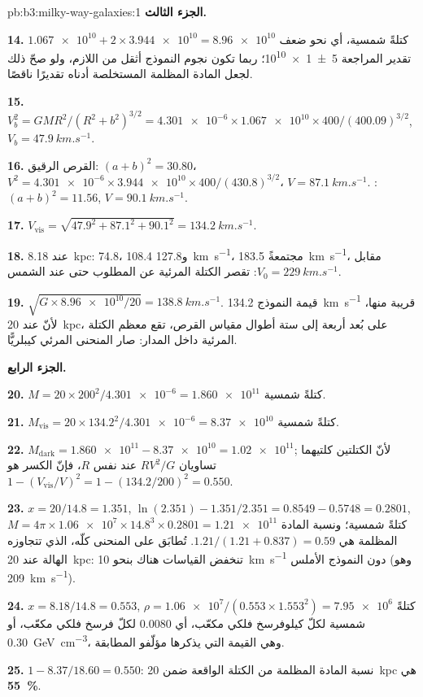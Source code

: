 \begin{solution}{pb:b3:milky-way-galaxies:1}
\textbf{الجزء الثالث.}

\textbf{14.} $\num{1.067e10} + 2\times\num{3.944e10} = \num{8.96e10}$ كتلةً
شمسية، أي نحو ضعف تقدير المراجعة \num[separate-uncertainty=true]{5 \pm 1 e10}؛ ربما تكون نجوم النموذج أثقل من اللازم،
ولو صحّ ذلك لجعل المادة المظلمة المستخلصة أدناه
تقديرًا ناقصًا.

\textbf{15.} $V_b^2 = GMR^2/(R^2 + b^2)^{3/2} = \num{4.301e-6}\times\num{1.067e10}
\times400/(400.09)^{3/2}$, $V_b = \qty{47.9}{km.s^{-1}}$.

\textbf{16.} القرص الرقيق: $(a + b)^2 = 30.80$، $V^2 = \num{4.301e-6}\times\num{3.944e10}
\times400/(430.8)^{3/2}$، $V = \qty{87.1}{km.s^{-1}}$. :
$(a + b)^2 = 11.56$, $V = \qty{90.1}{km.s^{-1}}$.

\textbf{17.} $V_\mathrm{vis} = \sqrt{47.9^2 + 87.1^2 + 90.1^2} =
\qty{134.2}{km.s^{-1}}$.

\textbf{18.} عند \qty{8.18}{kpc}: 74.8، 108.4 و\qty{127.8}{km.s^{-1}}،
مجتمعةً \qty{183.5}{km.s^{-1}}، مقابل $V_0 = \qty{229}{km.s^{-1}}$:
تقصر الكتلة المرئية عن المطلوب حتى عند الشمس.

\textbf{19.} $\sqrt{G\times\num{8.96e10}/20} = \qty{138.8}{km.s^{-1}}$.
قيمة النموذج \qty{134.2}{km.s^{-1}} قريبة منها، لأنّ عند \qty{20}{kpc}،
على بُعد أربعة إلى ستة أطوال مقياس القرص، تقع معظم الكتلة المرئية
داخل المدار: صار المنحنى المرئي كيبلريًّا.

\textbf{الجزء الرابع.}

\textbf{20.} $M = 20\times200^2/\num{4.301e-6} = \num{1.860e11}$ كتلةً شمسية.

\textbf{21.} $M_\mathrm{vis} = 20\times134.2^2/\num{4.301e-6} = \num{8.37e10}$
كتلةً شمسية.

\textbf{22.} $M_\mathrm{dark} = \num{1.860e11} - \num{8.37e10} = \num{1.02e11}$;
لأنّ الكتلتين كلتيهما تساويان $RV^2/G$ عند نفس $R$، فإنّ الكسر هو
$1 - (V_\mathrm{vis}/V)^2 = 1 - (134.2/200)^2 = \num{0.550}$.

\textbf{23.} $x = 20/14.8 = 1.351$, $\ln(2.351) - 1.351/2.351 = 0.8549 - 0.5748
= 0.2801$, $M = 4\pi\times\num{1.06e7}\times14.8^3\times0.2801 =
\num{1.21e11}$ كتلةً شمسية؛ ونسبة المادة المظلمة هي
$1.21/(1.21 + 0.837) = \num{0.59}$. تُطابَق  على المنحنى كلّه،
الذي تتجاوزه الهالة عند \qty{20}{kpc}: تنخفض القياسات هناك
بنحو \qty{10}{km.s^{-1}} دون النموذج الأملس (وهو \qty{209}{km.s^{-1}}).

\textbf{24.} $x = 8.18/14.8 = 0.553$, $\rho = \num{1.06e7}/(0.553\times1.553^2)
= \num{7.95e6}$ كتلةً شمسية لكلّ كيلوفرسخ فلكي مكعّب، أي \num{0.0080} لكلّ
فرسخ فلكي مكعّب، أو \qty{0.30}{GeV.cm^{-3}}، وهي القيمة التي يذكرها مؤلّفو
المطابقة.

\textbf{25.} $1 - 8.37/18.60 = \num{0.550}$: نسبة المادة المظلمة من
الكتلة الواقعة ضمن \qty{20}{kpc} هي
\textbf{\qty[text-series-to-math=true]{55}{\percent}}.
\end{solution}
